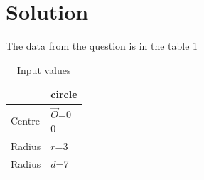 \documentclass[journal,12pt,twocolumn]{IEEEtran}
\begin{document}
\section{Solution}
The data from the question is in the table \ref{tab:table1}
\begin{table}[!ht]
\begin{center}
\begin{tabular}{ | m{2cm} | m{2cm} | }
\hline
 & circle \\
 \hline
Centre  & $\vec{O}$=\myvec{0\\0} \\ 
\hline
Radius & $r$=3  \\ 
\hline
Radius & $d$=7\\
\hline
\end{tabular}
\end{center}
\caption{Input values}
\label{tab:table1}
\end{table}
\end{document}
